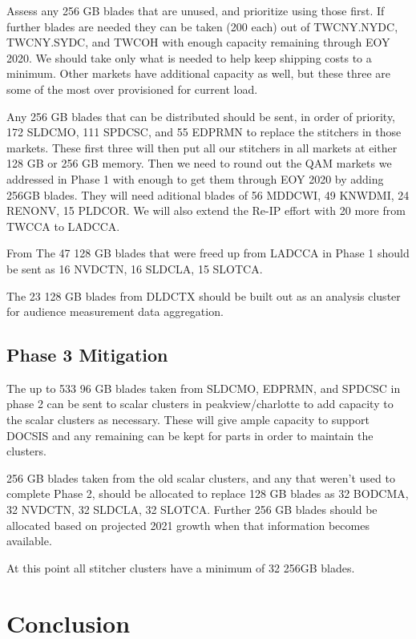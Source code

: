 \documentclass{article}
\begin{document}
Assess any 256 GB blades that are unused, and prioritize using those first. If further blades are needed they can be taken (200 each) out of TWCNY.NYDC, TWCNY.SYDC, and TWCOH with enough capacity remaining through EOY 2020. We should take only what is needed to help keep shipping costs to a minimum. Other markets have additional capacity as well, but these three are some of the most over provisioned for current load. 

Any 256 GB blades that can be distributed should be sent, in order of priority, 172 SLDCMO, 111 SPDCSC, and 55 EDPRMN to replace the stitchers in those markets. These first three will then put all our stitchers in all markets at either 128 GB or 256 GB memory. Then we need to round out the QAM markets we addressed in Phase 1 with enough to get them through EOY 2020 by adding 256GB blades. They will need aditional blades of 56 MDDCWI, 49 KNWDMI, 24 RENONV, 15 PLDCOR. We will also extend the Re-IP effort with 20 more from TWCCA to LADCCA. 

From The 47 128 GB blades that were freed up from LADCCA in Phase 1 should be sent as 16 NVDCTN, 16 SLDCLA, 15 SLOTCA. 

The 23 128 GB blades from DLDCTX should be built out as an analysis cluster for audience measurement data aggregation. 

\subsection{Phase 3 Mitigation}
\label{SECTION-Phase3}

The up to 533 96 GB blades taken from SLDCMO, EDPRMN, and SPDCSC in phase 2 can be sent to scalar clusters in peakview/charlotte to add capacity to the scalar clusters as necessary. These will give ample capacity to support DOCSIS and any remaining can be kept for parts in order to maintain the clusters. 

256 GB blades taken from the old scalar clusters, and any that weren't used to complete Phase 2, should be allocated to replace 128 GB blades as 32 BODCMA, 32 NVDCTN, 32 SLDCLA, 32 SLOTCA. Further 256 GB blades should be allocated based on projected 2021 growth when that information becomes available. 

At this point all stitcher clusters have a minimum of 32 256GB blades. 

\section{Conclusion}
\label{SECTION-Conclusion}
\end{document}
